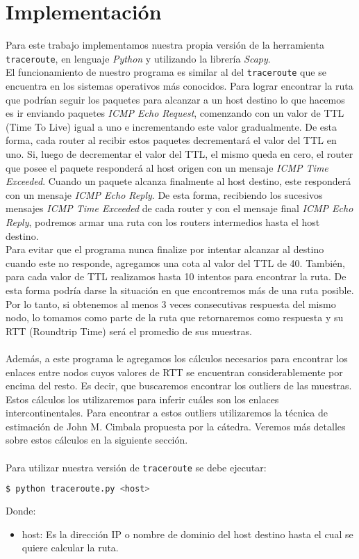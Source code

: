 \section{Implementación}

Para este trabajo implementamos nuestra propia versión de la herramienta \texttt{traceroute}, en lenguaje \emph{Python} y utilizando la librería \emph{Scapy}.
\\
El funcionamiento de nuestro programa es similar al del \texttt{traceroute} que se encuentra en los sistemas operativos más conocidos. Para lograr encontrar la ruta que podrían seguir los paquetes para alcanzar a un host destino lo que hacemos es ir enviando paquetes \emph{ICMP Echo Request}, comenzando con un valor de TTL (Time To Live) igual a uno e incrementando este valor gradualmente. De esta forma, cada router al recibir estos paquetes decrementará el valor del TTL en uno. Si, luego de decrementar el valor del TTL, el mismo queda en cero, el router que posee el paquete responderá al host origen con un mensaje \emph{ICMP Time Exceeded}. Cuando un paquete alcanza finalmente al host destino, este responderá con un mensaje \emph{ICMP Echo Reply}. De esta forma, recibiendo los sucesivos mensajes \emph{ICMP Time Exceeded} de cada router y con el mensaje final \emph{ICMP Echo Reply}, podremos armar una ruta con los routers intermedios hasta el host destino.
\\
Para evitar que el programa nunca finalize por intentar alcanzar al destino cuando este no responde, agregamos una cota al valor del TTL de 40.
También, para cada valor de TTL realizamos hasta 10 intentos para encontrar la ruta. De esta forma podría darse la situación en que encontremos más de una ruta posible. Por lo tanto, si obtenemos al menos 3 veces consecutivas respuesta del mismo nodo, lo tomamos como parte de la ruta que retornaremos como respuesta y su RTT (Roundtrip Time) será el promedio de sus muestras.
\\\\
Además, a este programa le agregamos los cálculos necesarios para encontrar los enlaces entre nodos cuyos valores de RTT se encuentran considerablemente por encima del resto. Es decir, que buscaremos encontrar los outliers de las muestras. Estos cálculos los utilizaremos para inferir cuáles son los enlaces intercontinentales. Para encontrar a estos outliers utilizaremos la técnica de estimación de John M. Cimbala propuesta por la cátedra. Veremos más detalles sobre estos cálculos en la siguiente sección.
\\\\
Para utilizar nuestra versión de \texttt{traceroute} se debe ejecutar:

\begin{lstlisting}[language=bash]
  $ python traceroute.py <host> 
\end{lstlisting}

Donde:

\begin{itemize}
\item host: Es la dirección IP o nombre de dominio del host destino hasta el cual se quiere calcular la ruta.
\end{itemize}